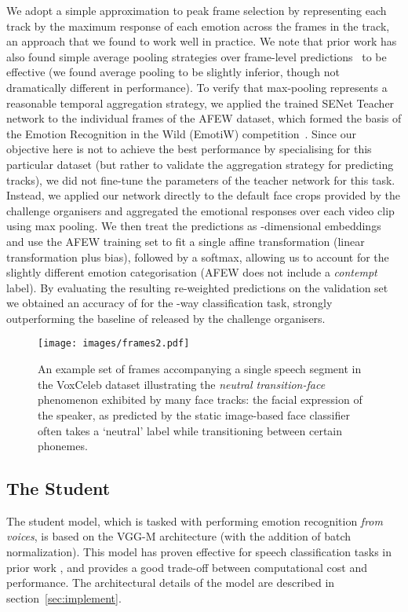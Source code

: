 \documentclass[sigconf]{acmart}
\begin{document}
We adopt a simple approximation to peak frame selection by representing each track by the maximum response of each emotion across the frames in the track, an approach that we found to work well in practice.  We note that prior work has also found simple average pooling strategies over frame-level predictions~\cite{bargal2016emotion,hu2017learning} to be effective (we found average pooling to be slightly inferior, though not dramatically different in performance). To verify that max-pooling represents a reasonable temporal aggregation strategy, we applied the trained SENet Teacher network to the individual frames of the AFEW  dataset, which formed the basis of the  Emotion Recognition in the Wild (EmotiW) competition~\cite{dhall2016emotiw}. Since our objective here is not to achieve the best performance by specialising for this particular dataset (but rather to validate the aggregation strategy for predicting tracks), we did not fine-tune the parameters of the teacher network for this task.  Instead, we applied our network directly to the default face crops provided by the challenge organisers and aggregated the emotional responses over each video clip using max pooling. We then treat the predictions as -dimensional embeddings and use the AFEW training set to fit a single affine transformation (linear transformation plus bias), followed by a softmax, allowing us to account for the slightly different emotion categorisation (AFEW does not include a \textit{contempt} label).  By evaluating the resulting re-weighted predictions on the validation set we obtained an accuracy of  for the -way classification task, strongly outperforming the baseline of  released by the challenge organisers. 

\begin{figure}[]
\centering
\texttt{[image: images/frames2.pdf]}
   \caption{An example set of frames accompanying a single speech segment in the VoxCeleb dataset illustrating the \textit{neutral transition-face} phenomenon exhibited by many face tracks:  the facial expression of the speaker, as predicted by the static image-based face classifier often takes a `neutral' label while transitioning between certain phonemes.}
\label{fig:exfacetrack}
\end{figure}

\subsection{The Student}

The student model, which is tasked with performing emotion recognition \textit{from voices}, is based on the VGG-M architecture \cite{Chatfield14} (with the addition of batch normalization). This model has proven effective for speech classification tasks in prior work \cite{Nagrani17}, and provides a good trade-off between computational cost and performance. The architectural details of the model are described in section~\ref{sec:implement}.
\end{document}
